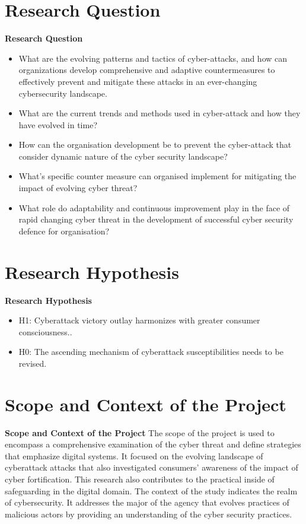 
\section{Research Question}
\label{sec:into_back}
\textbf{Research Question}
\begin{itemize}
    \item What are the evolving patterns and tactics of cyber-attacks, and how can organizations develop comprehensive and adaptive countermeasures to effectively prevent and mitigate these attacks in an ever-changing cybersecurity landscape.
    \item What are the current trends and methods used in cyber-attack and how they have evolved in time?
    \item How can the organisation development be to prevent the cyber-attack that consider dynamic nature of the cyber security landscape? 
    \item What's specific counter measure can organised implement for mitigating the impact of evolving cyber threat? 
    \item What role do adaptability and continuous improvement play in the face of rapid changing cyber threat in the development of successful cyber security defence for organisation?
\end{itemize}

\section{Research Hypothesis}
\label{sec:into_back}
\textbf{Research Hypothesis}
\begin{itemize}
     
    \item H1: Cyberattack victory outlay harmonizes with greater consumer consciousness..
    \item H0: The ascending mechanism of cyberattack susceptibilities needs to be revised.

\end{itemize}


\section{Scope and Context of the Project}
\label{sec:into_back}
\textbf{Scope and Context of the Project}
The scope of the project is used to encompass a comprehensive examination of the cyber threat and define strategies that emphasize digital systems. It focused on the evolving landscape of cyberattack attacks that also investigated consumers' awareness of the impact of cyber fortification. This research also contributes to the practical inside of safeguarding in the digital domain.
The context of the study indicates the realm of cybersecurity. It addresses the major of the agency that evolves practices of malicious actors by providing an understanding of the cyber security practices.


